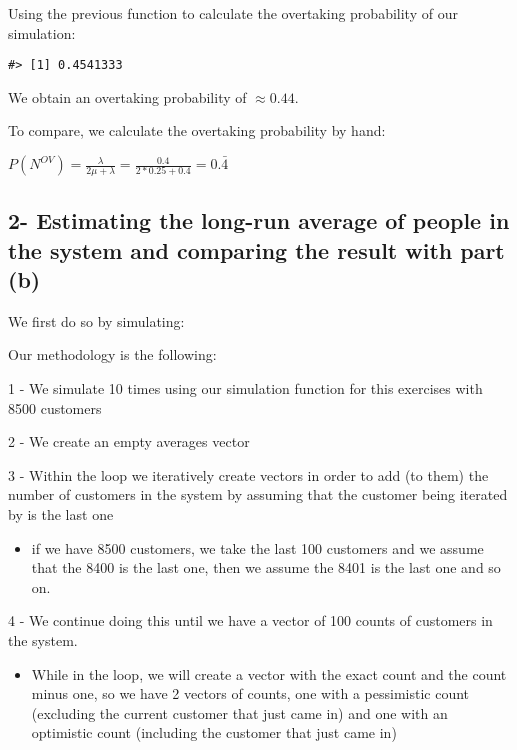 \documentclass[]{article}
\providecommand{\tightlist}{%
  \setlength{\itemsep}{0pt}\setlength{\parskip}{0pt}}
\begin{document}
Using the previous function to calculate the overtaking probability of
our simulation:

\begin{verbatim}
#> [1] 0.4541333
\end{verbatim}

We obtain an overtaking probability of \(\approx 0.44\).

To compare, we calculate the overtaking probability by hand:

\(P(N^{OV}) = \frac{\lambda}{2 \mu + \lambda} = \frac{0.4}{2 * 0.25 + 0.4} = 0. \bar{4}\)

\newpage

\hypertarget{estimating-the-long-run-average-of-people-in-the-system-and-comparing-the-result-with-part-b}{%
\subsection{2- Estimating the long-run average of people in the system
and comparing the result with part
(b)}\label{estimating-the-long-run-average-of-people-in-the-system-and-comparing-the-result-with-part-b}}

We first do so by simulating:

Our methodology is the following:

1 - We simulate 10 times using our simulation function for this
exercises with 8500 customers

2 - We create an empty averages vector

3 - Within the loop we iteratively create vectors in order to add (to
them) the number of customers in the system by assuming that the
customer being iterated by is the last one

\begin{itemize}
\tightlist
\item
  if we have 8500 customers, we take the last 100 customers and we
  assume that the 8400 is the last one, then we assume the 8401 is the
  last one and so on.
\end{itemize}

4 - We continue doing this until we have a vector of 100 counts of
customers in the system.

\begin{itemize}
\tightlist
\item
  While in the loop, we will create a vector with the exact count and
  the count minus one, so we have 2 vectors of counts, one with a
  pessimistic count (excluding the current customer that just came in)
  and one with an optimistic count (including the customer that just
  came in)
\end{itemize}
\end{document}

